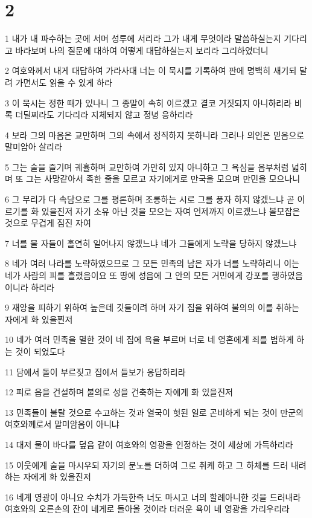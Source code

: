 \chapter{2}

\par 1 내가 내 파수하는 곳에 서며 성루에 서리라 그가 내게 무엇이라 말씀하실는지 기다리고 바라보며 나의 질문에 대하여 어떻게 대답하실는지 보리라 그리하였더니
\par 2 여호와께서 내게 대답하여 가라사대 너는 이 묵시를 기록하여 판에 명백히 새기되 달려 가면서도 읽을 수 있게 하라
\par 3 이 묵시는 정한 때가 있나니 그 종말이 속히 이르겠고 결코 거짓되지 아니하리라 비록 더딜찌라도 기다리라 지체되지 않고 정녕 응하리라
\par 4 보라 그의 마음은 교만하며 그의 속에서 정직하지 못하니라 그러나 의인은 믿음으로 말미암아 살리라
\par 5 그는 술을 즐기며 궤휼하며 교만하여 가만히 있지 아니하고 그 욕심을 음부처럼 넓히며 또 그는 사망같아서 족한 줄을 모르고 자기에게로 만국을 모으며 만민을 모으나니
\par 6 그 무리가 다 속담으로 그를 평론하며 조롱하는 시로 그를 풍자 하지 않겠느냐 곧 이르기를 화 있을진저 자기 소유 아닌 것을 모으는 자여 언제까지 이르겠느냐 볼모잡은 것으로 무겁게 짐진 자여
\par 7 너를 물 자들이 홀연히 일어나지 않겠느냐 네가 그들에게 노략을 당하지 않겠느냐
\par 8 네가 여러 나라를 노략하였으므로 그 모든 민족의 남은 자가 너를 노략하리니 이는 네가 사람의 피를 흘렸음이요 또 땅에 성읍에 그 안의 모든 거민에게 강포를 행하였음이니라 하리라
\par 9 재앙을 피하기 위하여 높은데 깃들이려 하며 자기 집을 위하여 불의의 이를 취하는 자에게 화 있을찐저
\par 10 네가 여러 민족을 멸한 것이 네 집에 욕을 부르며 너로 네 영혼에게 죄를 범하게 하는 것이 되었도다
\par 11 담에서 돌이 부르짖고 집에서 들보가 응답하리라
\par 12 피로 읍을 건설하며 불의로 성을 건축하는 자에게 화 있을진저
\par 13 민족들이 불탈 것으로 수고하는 것과 열국이 헛된 일로 곤비하게 되는 것이 만군의 여호와께로서 말미암음이 아니냐
\par 14 대저 물이 바다를 덮음 같이 여호와의 영광을 인정하는 것이 세상에 가득하리라
\par 15 이웃에게 술을 마시우되 자기의 분노를 더하여 그로 취케 하고 그 하체를 드러 내려 하는 자에게 화 있을진저
\par 16 네게 영광이 아니요 수치가 가득한즉 너도 마시고 너의 할례아니한 것을 드러내라 여호와의 오른손의 잔이 네게로 돌아올 것이라 더러운 욕이 네 영광을 가리우리라
